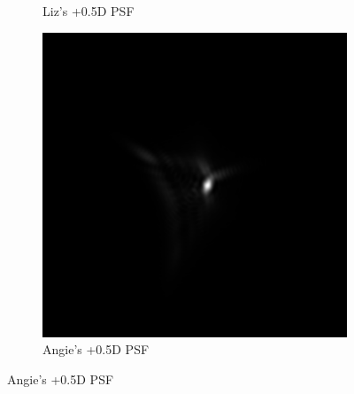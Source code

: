 \documentclass{article}
\begin{document}
\begin{figure}[H]
\begin{subfigure}{.3\textwidth}
  \caption{Liz's +0.5D PSF}
  \label{fig:liz05dpsf}
\end{subfigure}
\begin{subfigure}{.3\textwidth}
  \centering
  \includegraphics[width=1\linewidth]{Angie_R_0526_1_500_zer_05_5_PSF.png}
  \caption{Angie's +0.5D PSF}
  \label{fig:angie05dpsf}
\end{subfigure}

\medskip


\end{figure}
\end{document}

